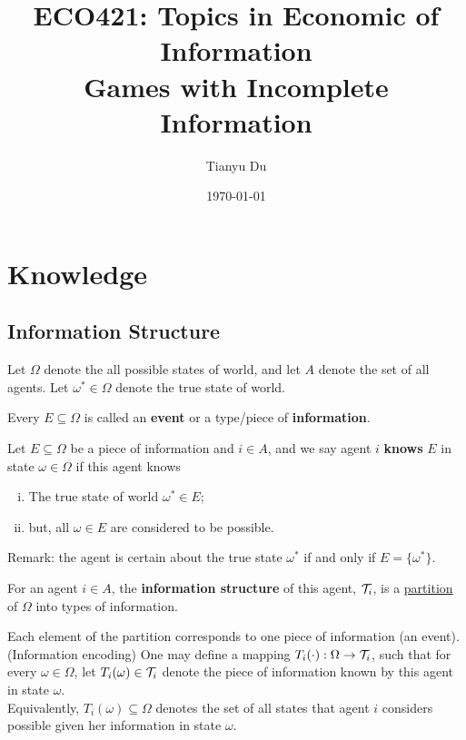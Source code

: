 \documentclass{article}
\title{ECO421: Topics in Economic of Information \\ \large Games with Incomplete Information}
\date{\today}
\author{Tianyu Du}
\begin{document}
    \maketitle
    \tableofcontents
    \newpage
    
    \section{Knowledge}
    \subsection{Information Structure}
    \begin{notation}
    	Let $\Omega$ denote the all possible states of world, and let $A$ denote the set of all agents. Let $\omega^* \in \Omega$ denote the true state of world.
    \end{notation}
	
	\begin{definition}
		Every $E \subseteq \Omega$ is called an \textbf{event} or a type/piece of \textbf{information}.
	\end{definition}
	
    \begin{definition}
    	Let $E \subseteq \Omega$ be a piece of information and $i \in A$, and we say agent $i$ \textbf{knows} $E$ in state $\omega \in \Omega$ if this agent knows
    	\begin{enumerate}[(i)]
    		\item The true state of world $\omega^* \in E$;
    		\item but, all $\omega \in E$ are considered to be possible.
    	\end{enumerate}
    	Remark: the agent is certain about the true state $\omega^*$ if and only if $E = \{\omega^*\}$.
    \end{definition}
    
    \begin{definition}
    	For an agent $i \in A$, the \textbf{information structure} of this agent, $\mathcal{{T}}_i$, is a \ul{partition} of $\Omega$ into types of information.
    \end{definition}
    
    \begin{notation}
    	Each element of the partition corresponds to one piece of information (an event). \\
    	(Information encoding) One may define a mapping $T_i(\cdot): \Omega \to \mathcal{{T}}_i$, such that for every $\omega \in \Omega$, let $T_i(\omega) \in \mathcal{{T}}_i$ denote the piece of information known by this agent in state $\omega$. \\
    	Equivalently, $T_i(\omega) \subseteq \Omega$ denotes the set of all states that agent $i$ considers possible given her information in state $\omega$.
    \end{notation}
    
\end{document}
